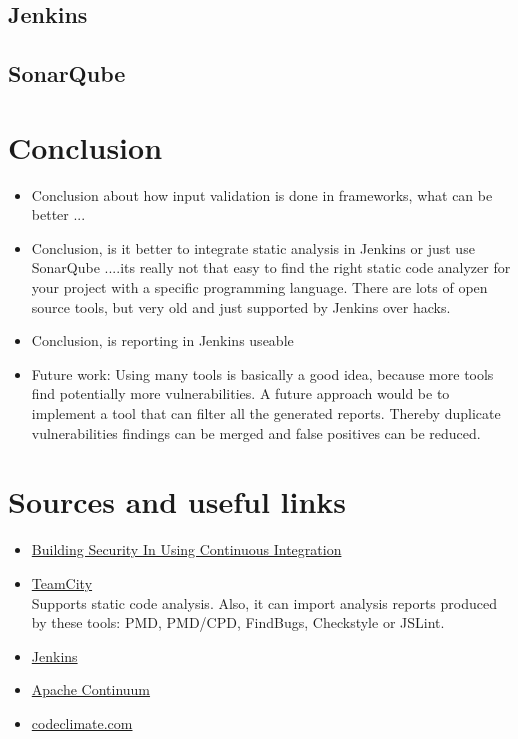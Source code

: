 \documentclass[conference]{IEEEtran}
\begin{document}
\subsection{Jenkins}
\label{sec:evaluation_jenkins}

\subsection{SonarQube}
\label{sec:evaluation_sonarqube}




\section{Conclusion}
\label{sec:conclusion}
\begin{itemize}
	\item Conclusion about how input validation is done in frameworks, what can be better ...
	\item Conclusion, is it better to integrate static analysis in Jenkins or just use SonarQube
	....its really not that easy to find the right static code analyzer for your project with a specific programming language. There are lots of open source tools, but very old and just supported by Jenkins over hacks.
	\item Conclusion, is reporting in Jenkins useable
	\item Future work: Using many tools is basically a good idea, because more tools find potentially more vulnerabilities. A future approach would be to implement a tool that can filter all the generated reports. Thereby duplicate vulnerabilities findings can be merged and false positives can be reduced.
\end{itemize}






\section{Sources and useful links}
\begin{itemize}
	\item \href{http://www.crosstalkonline.org/storage/issue-archives/2010/201003/201003-Stiehm.pdf}{Building Security In Using Continuous Integration}
	\item \href{http://www.jetbrains.com/teamcity}{TeamCity}\\
	Supports static code analysis. Also, it can import analysis reports produced by these tools: PMD, PMD/CPD, FindBugs, Checkstyle or JSLint.
	\item \href{http://jenkins-ci.org}{Jenkins}
	\item \href{http://continuum.apache.org}{Apache Continuum}	
	\item \href{http://codeclimate.com}{codeclimate.com}
\end{itemize}






\end{document}
